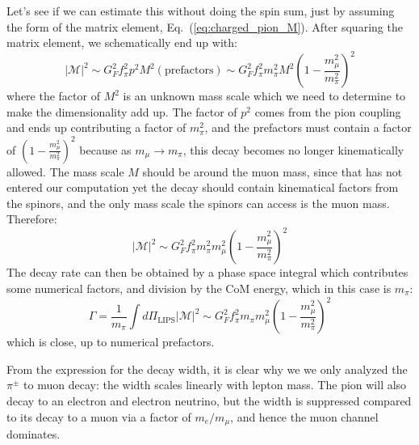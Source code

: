 \documentclass[11pt, oneside]{article}   	%
\theoremstyle{definition}
\numberwithin{equation}{subsection}		%
\begin{document}
Let's see if we can estimate this without doing the spin sum, just by assuming the form of the matrix element, Eq.~(\ref{eq:charged_pion_M}). After squaring the matrix element, we 
schematically end up with:
\begin{equation}
	|\mathcal M|^2\sim G_F^2 f_\pi^2 p^2 M^2 (\mathrm{prefactors})\sim G_F^2 f_\pi^2 m_\pi^2 M^2 \left(1 - \frac{m_\mu^2}{m_\pi^2}\right)^2
\end{equation}
where the factor of $M^2$ is an unknown mass scale which we need to determine to make the dimensionality add up. The factor of $p^2$ comes from the pion coupling and 
ends up contributing a factor of $m_\pi^2$, and the prefactors must contain a factor of $(1 - \frac{m_\mu^2}{m_\pi^2})^2$ because as $m_\mu\rightarrow m_\pi$, this decay becomes 
no longer kinematically allowed. The mass scale $M$ should be around the muon mass, since that has not entered our computation yet the decay should contain kinematical factors 
from the spinors, and the only mass scale the spinors can access is the muon mass. Therefore:
\begin{equation}
	|\mathcal M|^2\sim G_F^2 f_\pi^2 m_\pi^2 m_\mu^2 \left(1 - \frac{m_\mu^2}{m_\pi^2}\right)^2
\end{equation}
The decay rate can then be obtained by a phase space integral which contributes some numerical factors, and division by the CoM energy, which in this case is $m_\pi$:
\begin{equation}
	\Gamma = \frac{1}{m_\pi}\int d\Pi_\mathrm{LIPS}|\mathcal M|^2\sim G_F^2 f_\pi^2 m_\pi m_\mu^2 \left(1 - \frac{m_\mu^2}{m_\pi^2}\right)^2
\end{equation}
which is close, up to numerical prefactors. 

From the expression for the decay width, it is clear why we we only analyzed the $\pi^\pm$ to muon decay: the width scales linearly with 
lepton mass. The pion will also decay to an electron and electron neutrino, but the width is suppressed compared to its decay to 
a muon via a factor of $m_e / m_\mu$, and hence the muon channel dominates. 
\end{document}
